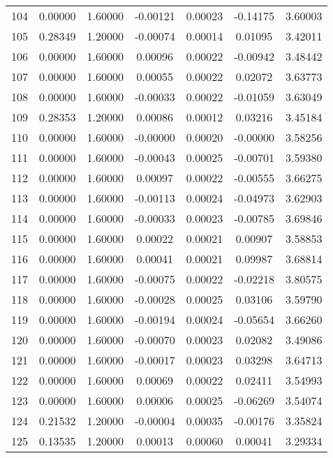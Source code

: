 \begin{longtable}{c c c c c c c}
104 &  0.00000 &      1.60000 & -0.00121 &   0.00023 &  -0.14175 &   3.60003 \\
105 &  0.28349 &      1.20000 & -0.00074 &   0.00014 &   0.01095 &   3.42011 \\
106 &  0.00000 &      1.60000 &  0.00096 &   0.00022 &  -0.00942 &   3.48442 \\
107 &  0.00000 &      1.60000 &  0.00055 &   0.00022 &   0.02072 &   3.63773 \\
108 &  0.00000 &      1.60000 & -0.00033 &   0.00022 &  -0.01059 &   3.63049 \\
109 &  0.28353 &      1.20000 &  0.00086 &   0.00012 &   0.03216 &   3.45184 \\
110 &  0.00000 &      1.60000 & -0.00000 &   0.00020 &  -0.00000 &   3.58256 \\
111 &  0.00000 &      1.60000 & -0.00043 &   0.00025 &  -0.00701 &   3.59380 \\
112 &  0.00000 &      1.60000 &  0.00097 &   0.00022 &  -0.00555 &   3.66275 \\
113 &  0.00000 &      1.60000 & -0.00113 &   0.00024 &  -0.04973 &   3.62903 \\
114 &  0.00000 &      1.60000 & -0.00033 &   0.00023 &  -0.00785 &   3.69846 \\
115 &  0.00000 &      1.60000 &  0.00022 &   0.00021 &   0.00907 &   3.58853 \\
116 &  0.00000 &      1.60000 &  0.00041 &   0.00021 &   0.09987 &   3.68814 \\
117 &  0.00000 &      1.60000 & -0.00075 &   0.00022 &  -0.02218 &   3.80575 \\
118 &  0.00000 &      1.60000 & -0.00028 &   0.00025 &   0.03106 &   3.59790 \\
119 &  0.00000 &      1.60000 & -0.00194 &   0.00024 &  -0.05654 &   3.66260 \\
120 &  0.00000 &      1.60000 & -0.00070 &   0.00023 &   0.02082 &   3.49086 \\
121 &  0.00000 &      1.60000 & -0.00017 &   0.00023 &   0.03298 &   3.64713 \\
122 &  0.00000 &      1.60000 &  0.00069 &   0.00022 &   0.02411 &   3.54993 \\
123 &  0.00000 &      1.60000 &  0.00006 &   0.00025 &  -0.06269 &   3.54074 \\
124 &  0.21532 &      1.20000 & -0.00004 &   0.00035 &  -0.00176 &   3.35824 \\
125 &  0.13535 &      1.20000 &  0.00013 &   0.00060 &   0.00041 &   3.29334 \\

\end{longtable}
